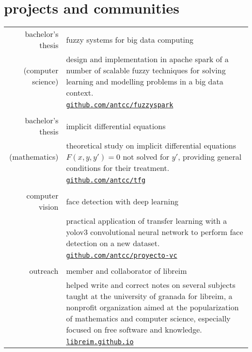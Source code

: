 \documentclass[a4paper,10pt]{article} %
\begin{document}

\section{projects and communities}

\begin{tabular}{r|p{11cm}}
bachelor's thesis  & fuzzy systems for big data computing\\
\footnotesize{(computer science)} & \footnotesize{design and implementation in apache spark of a number of scalable fuzzy techniques for solving learning and modelling problems in a big data context.}\\
& \footnotesize{\href{https://github.com/antcc/fuzzyspark}{\texttt{github.com/antcc/fuzzyspark}}}\\
\multicolumn{2}{c}{} \\

bachelor's thesis & implicit differential equations\\
\footnotesize{(mathematics)} & \footnotesize{theoretical study on implicit differential equations $F(x, y, y')=0$ not solved for $y'$, providing general conditions for their treatment.}\\
& \footnotesize{\href{https://github.com/antcc/tfg}{\texttt{github.com/antcc/tfg}}}\\
\multicolumn{2}{c}{} \\

computer vision & face detection with deep learning\\
& \footnotesize{practical application of transfer learning with a yolov3 convolutional neural network to perform face detection on a new dataset.}\\
& \footnotesize{\href{https://github.com/antcc/proyecto-vc}{\texttt{github.com/antcc/proyecto-vc}}}\\
\multicolumn{2}{c}{} \\


outreach & member and collaborator of libreim\\
& \footnotesize{helped write and correct notes on several subjects taught at the university of granada for libreim, a nonprofit organization aimed at the popularization of mathematics and computer science, especially focused on free software and knowledge.}\\
& \footnotesize{\href{https://libreim.github.io/}{\texttt{libreim.github.io}}}\\
\end{tabular}
\end{document}
